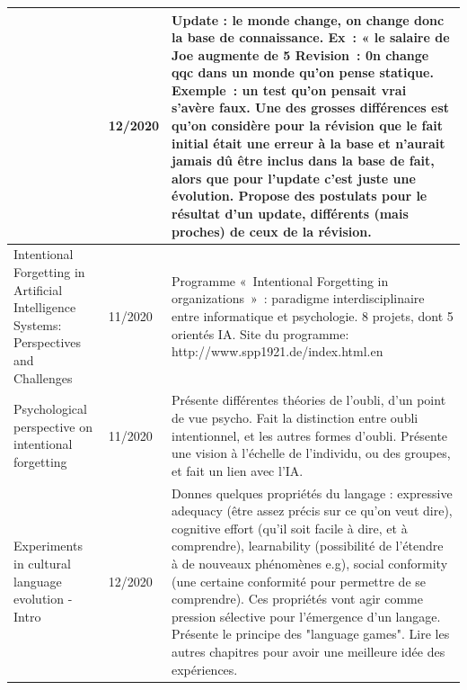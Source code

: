 \documentclass[french]{article}
\begin{document}
\begin{table}[h]
\begin{center}
\begin{tabular}{|p{}|p{}|p{}|}
            & 12/2020
            & Update : le monde change, on change donc la base de connaissance. Ex : « le salaire de Joe augmente de 5%
            Revision : 0n change qqc dans un monde qu’on pense statique. Exemple : un test qu’on pensait vrai s’avère faux.
            Une des grosses différences est qu’on considère pour la révision que le fait initial était une erreur à la base et n’aurait jamais dû être inclus dans la base de fait, alors que pour l’update c’est juste une évolution. Propose des postulats pour le résultat d'un update, différents (mais proches) de ceux de la révision.
            \\
            \hline
            Intentional Forgetting in Artificial Intelligence Systems: Perspectives and Challenges \cite{timm_intentional_2018}
            & 11/2020
            & Programme « Intentional Forgetting in organizations » : paradigme interdisciplinaire entre informatique et psychologie. 8 projets, dont 5 orientés IA.
            Site du programme: http://www.spp1921.de/index.html.en \\
            \hline
            Psychological perspective on intentional forgetting \cite{ellwart_psychological_2019}
            & 11/2020
            & Présente différentes théories de l’oubli, d’un point de vue psycho. Fait la distinction entre oubli intentionnel, et les autres formes d’oubli. Présente une vision à l’échelle de l’individu, ou des groupes, et fait un lien avec l’IA. \\
            \hline
            Experiments in cultural language evolution - Intro \cite{steels_experiments_2012}
            & 12/2020
            & Donnes quelques propriétés du langage : expressive adequacy (être assez précis sur ce qu'on veut dire), cognitive effort (qu'il soit facile à dire, et à comprendre), learnability (possibilité de l'étendre à de nouveaux phénomènes e.g), social conformity (une certaine conformité pour permettre de se comprendre). Ces propriétés vont agir comme pression sélective pour l'émergence d'un langage. Présente le principe des "language games". Lire les autres chapitres pour avoir une meilleure idée des expériences. \\
            \hline
        \end{tabular}
    \end{center}
    \end{table}
    \newpage
\end{document}
